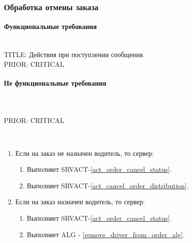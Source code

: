 \subsubsection{Обработка отмены заказа}

      \paragraph{Функциональные требования} \mbox{}\\

        TITLE: Действия при поступлении сообщения.
      	\\
      	PRIOR: CRITICAL\\

      \paragraph{Не функциональные требования} \mbox{}\\

      	\\
      	PRIOR: CRITICAL\\

    	\begin{alg}\label{cancel_order_alg} \mbox{}\\

    		\begin{enumerate}
    			\item Если на заказ не назначен водитель, то сервер:
    			\begin{enumerate}
    				\item Выполняет SRVACT-\ref{act_order_cancel_status}.
    				\item Выполняет SRVACT-\ref{act_cancel_order_distribution}.
    			\end{enumerate}
    			\item Если на заказ назначен водитель, то сервер:
    			\begin{enumerate}
    				\item Выполняет SRVACT-\ref{act_order_cancel_status}.
    				\item Выполняет ALG - \ref{remove_driver_from_order_alg}.
    			\end{enumerate}
    		\end{enumerate}

    	\end{alg}

